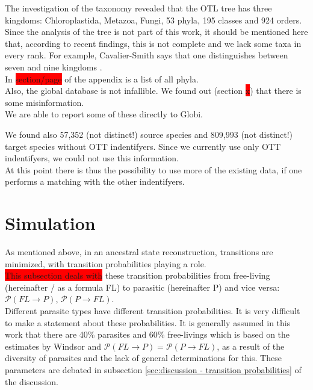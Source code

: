     The investigation of the taxonomy revealed that the OTL tree has three kingdoms: Chloroplastida, 
      Metazoa, Fungi, 53 phyla, 195 classes and 924 orders. \\
    Since the analysis of the tree is not part of this work, it should be mentioned here that, 
      according to recent findings, this is not complete and we lack some taxa in every rank. For 
      example, Cavalier-Smith says that one distinguishes between seven and nine kingdoms 
      \cite{CavalierSmith1981}. \\
    In \colorbox{red}{section/page} \pageref{subsec:listPhyla} of the appendix is a list of all phyla. \\

    Also, the global database is not infallible. We found out (section \colorbox{red}{x}) that there is some 
      misinformation. \\
    We are able to report some of these directly to Globi.

    We found also 57,352 (not distinct!) source species and 809,993 (not distinct!) target species 
      without OTT indentifyers. Since we currently use only OTT indentifyers, we could not use this information. \\
    At this point there is thus the possibility to use more of the existing data, if one performs a 
      matching with the other indentifyers.

  \section{Simulation} \label{sec:discussion - simulation}

  As mentioned above, in an ancestral state reconstruction, transitions are minimized, with 
  transition probabilities playing a role. \\
\colorbox{red}{This subsection deals with} these transition probabilities from free-living (hereinafter / as a 
  formula FL) to parasitic (hereinafter P) and vice versa: $\mathcal{P}(FL \rightarrow P)$, 
  $\mathcal{P}(P \rightarrow FL)$. \\
Different parasite types have different transition probabilities. It is very difficult to make a 
  statement about these probabilities. It is generally assumed in this work that there are 40\% 
  parasites and 60\% free-livings which is based on the estimates by Windsor \cite{Windsor1998} 
  and $\mathcal{P}(FL \rightarrow P) = \mathcal{P}(P \rightarrow FL)$, as a result of the 
  diversity of parasites and the lack of general determinations for this. These parameters are 
  debated in subsection \ref{sec:discussion - transition probabilities} of the discussion. \\

